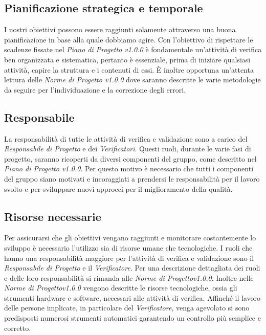 \subsection{Pianificazione strategica e temporale}
I nostri obiettivi possono essere raggiunti solamente attraverso una buona pianificazione in base alla quale dobbiamo agire. Con l'obiettivo di rispettare le scadenze fissate nel \textit{Piano di Progetto v1.0.0} è fondamentale un'attività di verifica ben organizzata e sistematica, pertanto è essenziale, prima di iniziare qualsiasi attività, capire la struttura e i contenuti di essi. È inoltre opportuna un'attenta lettura delle \textit{Norme di Progetto v1.0.0} dove saranno descritte le varie metodologie da seguire per l'individuazione e la correzione degli errori.

\subsection{Responsabile}
La responsabilità di tutte le attività di verifica e validazione sono a carico del \textit{Responsabile di Progetto} e dei \textit{Verificatori}. Questi ruoli, durante le varie fasi di progetto, saranno ricoperti da diversi componenti del gruppo, come descritto nel \textit{Piano di Progetto v1.0.0}. Per questo motivo è necessario che tutti i componenti del gruppo siano motivati e incoraggiati a prendersi le responsabilità per il lavoro svolto e per sviluppare nuovi approcci per il miglioramento della qualità.

\subsection{Risorse necessarie}
Per assicurarsi che gli obiettivi vengano raggiunti e monitorare costantemente lo sviluppo è necessario l'utilizzo sia di risorse umane che tecnologiche. I ruoli che hanno una responsabilità maggiore per l'attività di verifica e validazione sono il \textit{Responsabile di Progetto} e il \textit{Verificatore}. Per una descrizione dettagliata dei ruoli e delle loro responsabilità si rimanda alle \textit{Norme di Progettov1.0.0}. Inoltre nelle \textit{Norme di Progettov1.0.0} vengono descritte le risorse tecnologiche, ossia gli strumenti hardware e software, necessari alle attività di verifica. Affinché il lavoro delle persone implicate, in particolare del \textit{Verificatore}, venga agevolato si sono predisposti numerosi strumenti automatici garantendo un controllo più semplice e corretto.

